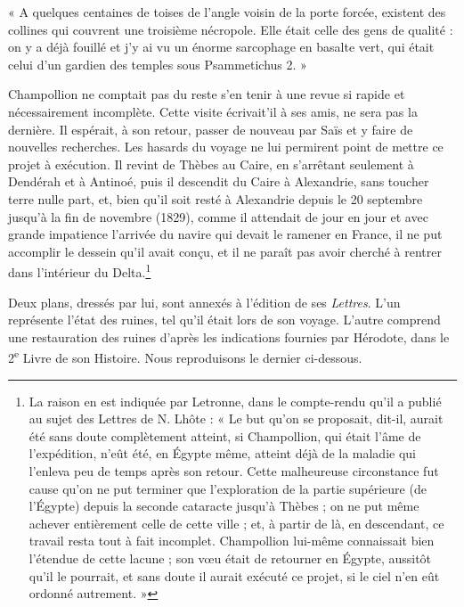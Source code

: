 \documentclass[a4paper, 11pt, oneside]{article}
\begin{document}
« A quelques centaines de toises de l'angle voisin de la porte forcée, existent des collines qui couvrent une troisième nécropole. Elle était celle des gens de qualité : on y a déjà fouillé et j'y ai vu un énorme sarcophage en basalte vert, qui était celui d'un gardien des temples sous Psammetichus 2. »

Champollion ne comptait pas du reste s'en tenir à une revue si rapide et nécessairement incomplète. Cette visite écrivait'il à ses amis, ne sera pas la dernière. Il espérait, à son retour, passer de nouveau par Saïs et y faire de nouvelles recherches. Les hasards du voyage ne lui permirent point de mettre ce projet à exécution. Il revint de Thèbes au Caire, en s'arrêtant seulement à Dendérah et à Antinoé, puis il descendit du Caire à Alexandrie, sans toucher terre nulle part, et, bien qu'il soit resté à Alexandrie depuis le 20 septembre jusqu'à la fin de novembre (1829), comme il attendait de jour en jour et avec grande impatience l'arrivée du navire qui devait le ramener en France, il ne put accomplir le dessein qu'il avait conçu, et il ne paraît pas avoir cherché à rentrer dans l'intérieur du Delta.\footnote{La raison en est indiquée par Letronne, dans le compte-rendu qu'il a publié au sujet des Lettres de N. Lhôte : « Le but qu'on se proposait, dit-il, aurait été sans doute complètement atteint, si Champollion, qui était l'âme de l'expédition, n'eût été, en Égypte même, atteint déjà de la maladie qui l'enleva peu de temps après son retour. Cette malheureuse circonstance fut cause qu'on ne put terminer que l'exploration de la partie supérieure (de l'Égypte) depuis la seconde cataracte jusqu'à Thèbes ; on ne put même achever entièrement celle de cette ville ; et, à partir de là, en descendant, ce travail resta tout à fait incomplet. Champollion lui-même connaissait bien l'étendue de cette lacune ; son vœu était de retourner en Égypte, aussitôt qu'il le pourrait, et sans doute il aurait exécuté ce projet, si le ciel n'en eût ordonné autrement. »}

Deux plans, dressés par lui, sont annexés à l'édition de ses \emph{Lettres}. L'un représente l'état des ruines, tel qu'il était lors de son voyage. L'autre comprend une restauration des ruines d'après les indications fournies par Hérodote, dans le 2\textsuperscript{e} Livre de son Histoire. Nous reproduisons le dernier ci-dessous.
\end{document}
